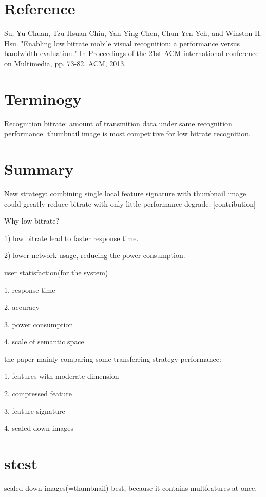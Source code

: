 \documentclass[12pt]{article}
\begin{document}
\maketitle

\section{Reference}
Su, Yu-Chuan, Tzu-Hsuan Chiu, Yan-Ying Chen, Chun-Yen Yeh, and Winston H. Hsu. "Enabling low bitrate mobile visual recognition: a performance versus bandwidth evaluation." In Proceedings of the 21st ACM international conference on Multimedia, pp. 73-82. ACM, 2013.


\section{Terminogy}
Recognition bitrate: amount of transmition data under same recognition performance.
thumbnail image is most competitive for low bitrate recognition.

\section{Summary}
New strategy: combining single local feature signature with thumbnail image could greatly reduce bitrate with only little performance degrade. [contribution]


Why low bitrate?

    1) low bitrate lead to faster response time.
    
    2) lower network usage, reducing the power consumption.


user statisfaction(for the system)

    1. response time

    2. accuracy

    3. power consumption

    4. scale of semantic space

the paper mainly comparing some transferring strategy performance:

    1. features with moderate dimension

    2. compressed feature

    3. feature signature

    4. scaled-down images

\section{stest}
scaled-down images(=thumbnail) best, because it contains multfeatures at once.
\end{document}
